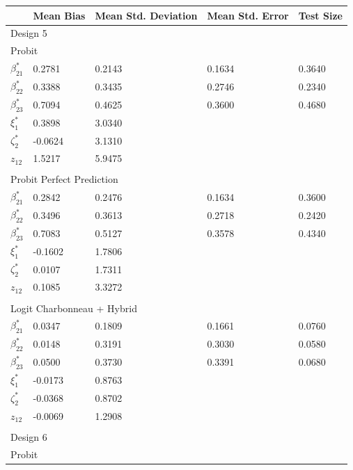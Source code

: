 \begin{table}
\small
\centering
\begin{tabular}{p{3cm}p{1.8cm}p{1.8cm}p{1.8cm}p{1.8cm}}
  \hline
   \quad & Mean Bias & Mean Std. Deviation & Mean Std. Error & Test Size \\
   \hline
   \multicolumn{5}{l}{Design 5} \\
   \hline
    \multicolumn{5}{l}{Probit} \\
    $\beta_{21}^*$ &0.2781 &0.2143 & 0.1634 &  0.3640 \\
    $\beta_{22}^*$ &0.3388 &0.3435 & 0.2746 & 0.2340 \\
    $\beta_{23}^*$ & 0.7094& 0.4625 &0.3600 & 0.4680\\
    $\xi_{1}^*$ & 0.3898 & 3.0340 & & \\
    $\zeta_{2}^*$ & -0.0624 & 3.1310 & & \\
     $z_{12}$ &1.5217 & 5.9475 &  & \\
     & & & & \\
    \hline
    \multicolumn{5}{l}{Probit Perfect Prediction} \\
    $\beta_{21}^*$ & 0.2842 & 0.2476& 0.1634 &  0.3600 \\
    $\beta_{22}^*$ & 0.3496 & 0.3613& 0.2718 &  0.2420\\
    $\beta_{23}^*$ & 0.7083 & 0.5127& 0.3578 & 0.4340\\
    $\xi_{1}^*$ & -0.1602 & 1.7806 & & \\
    $\zeta_{2}^*$ & 0.0107 & 1.7311 & & \\
     $z_{12}$ & 0.1085 & 3.3272 &  & \\
     & & & & \\
    \hline
    \multicolumn{5}{l}{Logit Charbonneau + Hybrid} \\
    $\beta_{21}^*$ & 0.0347 & 0.1809 & 0.1661 & 0.0760\\
    $\beta_{22}^*$ & 0.0148 & 0.3191 & 0.3030 & 0.0580\\
    $\beta_{23}^*$ & 0.0500 & 0.3730 & 0.3391 & 0.0680\\
    $\xi_{1}^*$ & -0.0173 & 0.8763 & & \\
    $\zeta_{2}^*$ & -0.0368 & 0.8702 & & \\
     $z_{12}$ & -0.0069 & 1.2908 &  & \\
     & & & & \\
   \hline
   \multicolumn{5}{l}{Design 6} \\
   \hline
    \multicolumn{5}{l}{Probit} \\

\end{tabular}
\end{table}
